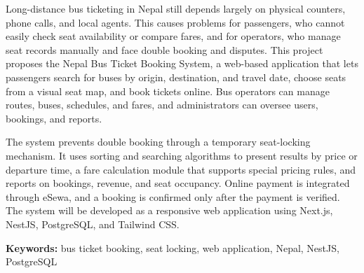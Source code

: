 \clearpage
{}  %

Long-distance bus ticketing in Nepal still depends largely on physical counters, phone calls, and local agents. This causes problems for passengers, who cannot easily check seat availability or compare fares, and for operators, who manage seat records manually and face double booking and disputes. This project proposes the Nepal Bus Ticket Booking System, a web-based application that lets passengers search for buses by origin, destination, and travel date, choose seats from a visual seat map, and book tickets online. Bus operators can manage routes, buses, schedules, and fares, and administrators can oversee users, bookings, and reports.

The system prevents double booking through a temporary seat-locking mechanism. It uses sorting and searching algorithms to present results by price or departure time, a fare calculation module that supports special pricing rules, and reports on bookings, revenue, and seat occupancy. Online payment is integrated through eSewa, and a booking is confirmed only after the payment is verified. The system will be developed as a responsive web application using Next.js, NestJS, PostgreSQL, and Tailwind CSS.

\textbf{Keywords:} bus ticket booking, seat locking, web application, Nepal, NestJS, PostgreSQL
